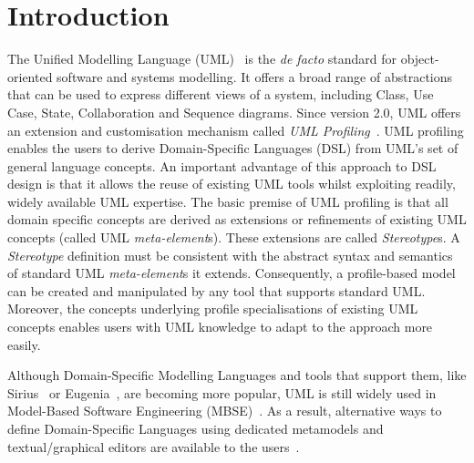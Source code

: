 \section{Introduction}
\label{sec:introduction}

The Unified Modelling Language (UML)~\cite{UML2015OMG} is the \emph{de facto} standard for object-oriented software and systems modelling. 
It offers a broad range of abstractions that can be used to express different views of a system, including Class, Use Case, State, Collaboration and Sequence diagrams. 
Since version 2.0, UML offers an extension and customisation mechanism called \emph{UML Profiling}~\cite{FuentesFernandez2004:UMLME}.
UML profiling enables the users to derive Domain-Specific Languages (DSL) from UML's set of general language concepts.
An important advantage of this approach to DSL design is that it allows the reuse of existing UML tools whilst exploiting readily, widely available UML expertise.
The basic premise of UML profiling is that all domain specific concepts are derived as extensions or refinements of existing UML concepts (called UML \textit{meta-element}s). 
These extensions are called \textit{Stereotype}s. 
A \textit{Stereotype} definition must be consistent with the abstract syntax and semantics of standard UML \textit{meta-element}s it extends. 
Consequently, a profile-based model can be created and manipulated by any tool that supports standard UML. 
Moreover, the concepts underlying profile specialisations of existing UML concepts enables users with UML knowledge to adapt to the approach more easily.

Although Domain-Specific Modelling Languages and tools that support them, like Sirius~\cite{viyovic2014sirius} or Eugenia~\cite{kolovos2015eugenia}, are becoming more popular, UML is still widely used in Model-Based Software Engineering (MBSE)~\cite{erickson2007theoretical}. 
As a result, alternative ways to define Domain-Specific Languages using dedicated metamodels and textual/graphical editors are available to the users~\cite{Bergmayr2014:MODELS,Pardillo2010:MODELS}. 

